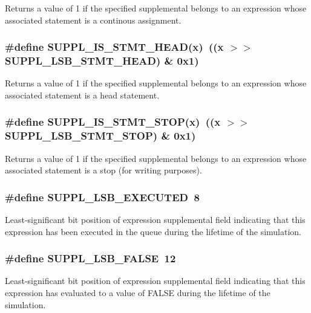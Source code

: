 Returns a value of 1 if the specified supplemental belongs to an expression whose associated statement is a continous assignment. 
\subsubsection{\setlength{\rightskip}{0pt plus 5cm}\#define SUPPL\_\-IS\_\-STMT\_\-HEAD(x)\ ((x $>$$>$ SUPPL\_\-LSB\_\-STMT\_\-HEAD) \& 0x1)}\label{group__expr__suppl_a14}


Returns a value of 1 if the specified supplemental belongs to an expression whose associated statement is a head statement. 
\subsubsection{\setlength{\rightskip}{0pt plus 5cm}\#define SUPPL\_\-IS\_\-STMT\_\-STOP(x)\ ((x $>$$>$ SUPPL\_\-LSB\_\-STMT\_\-STOP) \& 0x1)}\label{group__expr__suppl_a15}


Returns a value of 1 if the specified supplemental belongs to an expression whose associated statement is a stop (for writing purposes). 
\subsubsection{\setlength{\rightskip}{0pt plus 5cm}\#define SUPPL\_\-LSB\_\-EXECUTED\ 8}\label{group__expr__suppl_a2}


Least-significant bit position of expression supplemental field indicating that this expression has been executed in the queue during the lifetime of the simulation. 
\subsubsection{\setlength{\rightskip}{0pt plus 5cm}\#define SUPPL\_\-LSB\_\-FALSE\ 12}\label{group__expr__suppl_a6}


Least-significant bit position of expression supplemental field indicating that this expression has evaluated to a value of FALSE during the lifetime of the simulation. 
